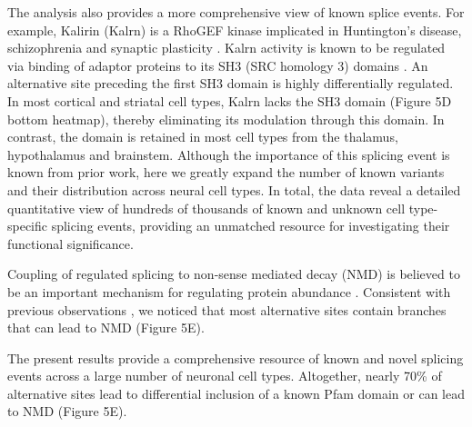 The analysis also provides a more comprehensive view of known splice events. For example, Kalirin (Kalrn) is a RhoGEF kinase implicated in Huntington's disease, schizophrenia and synaptic plasticity \citep{Penzes_2008}. Kalrn activity is known to be regulated via binding of adaptor proteins to its SH3 (SRC homology 3) domains \citep{Schiller_2006}. An alternative site preceding the first SH3 domain is highly differentially regulated. In most cortical and striatal cell types, Kalrn lacks the SH3 domain (Figure 5D bottom heatmap), thereby eliminating its modulation through this domain. In contrast, the domain is retained in most cell types from the thalamus, hypothalamus and brainstem. Although the importance of this splicing event is known from prior work, here we greatly expand the number of known variants and their distribution across neural cell types. In total, the data reveal a detailed quantitative view of hundreds of thousands of known and unknown cell type-specific splicing events, providing an unmatched resource for investigating their functional significance.

Coupling of regulated splicing to non-sense mediated decay (NMD) is believed to be an important mechanism for regulating protein abundance \cite{Lewis_2002}. Consistent with previous observations \citep{Yan_2015}, we noticed that most alternative sites contain branches that can lead to NMD (Figure 5E). 

The present results provide a comprehensive resource of known and novel splicing events across a large number of neuronal cell types. Altogether, nearly 70\% of alternative sites lead to differential inclusion of a known Pfam domain or can lead to NMD (Figure 5E). 
